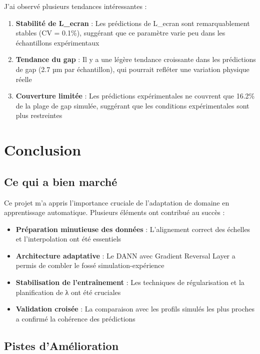 \documentclass[11pt,a4paper]{article}
\begin{document}
J'ai observé plusieurs tendances intéressantes :

\begin{enumerate}
    \item \textbf{Stabilité de L\_ecran} : Les prédictions de L\_ecran sont remarquablement stables (CV = 0.1\%), suggérant que ce paramètre varie peu dans les échantillons expérimentaux
    \item \textbf{Tendance du gap} : Il y a une légère tendance croissante dans les prédictions de gap (2.7 µm par échantillon), qui pourrait refléter une variation physique réelle
    \item \textbf{Couverture limitée} : Les prédictions expérimentales ne couvrent que 16.2\% de la plage de gap simulée, suggérant que les conditions expérimentales sont plus restreintes
\end{enumerate}

\section{Conclusion}

\subsection{Ce qui a bien marché}

Ce projet m'a appris l'importance cruciale de l'adaptation de domaine en apprentissage automatique. Plusieurs éléments ont contribué au succès :

\begin{itemize}
    \item \textbf{Préparation minutieuse des données} : L'alignement correct des échelles et l'interpolation ont été essentiels
    \item \textbf{Architecture adaptative} : Le DANN avec Gradient Reversal Layer a permis de combler le fossé simulation-expérience
    \item \textbf{Stabilisation de l'entraînement} : Les techniques de régularisation et la planification de λ ont été cruciales
    \item \textbf{Validation croisée} : La comparaison avec les profils simulés les plus proches a confirmé la cohérence des prédictions
\end{itemize}

\subsection{Pistes d'Amélioration}
\end{document}
